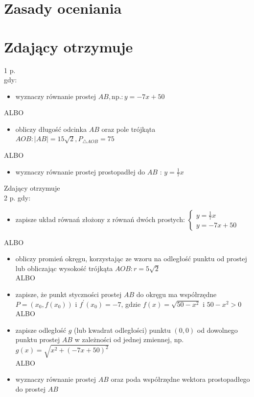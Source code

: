 \documentclass[10pt]{article}
\begin{document}
\section*{Zasady oceniania}
\section*{Zdający otrzymuje}
1 p.\\
gdy:

\begin{itemize}
  \item wyznaczy równanie prostej $A B, \mathrm{np} .: y=-7 x+50$
\end{itemize}

ALBO

\begin{itemize}
  \item obliczy długość odcinka $A B$ oraz pole trójkąta $A O B:|A B|=15 \sqrt{2}, P_{\triangle A O B}=75$
\end{itemize}

ALBO

\begin{itemize}
  \item wyznaczy równanie prostej prostopadłej do $A B$ : $y=\frac{1}{7} x$
\end{itemize}

Zdający otrzymuje\\
2 p. gdy:

\begin{itemize}
  \item zapisze układ równań złożony z równań dwóch prostych: $\left\{\begin{array}{l}y=\frac{1}{7} x \\ y=-7 x+50\end{array}\right.$
\end{itemize}

ALBO

\begin{itemize}
  \item obliczy promień okręgu, korzystając ze wzoru na odległość punktu od prostej lub obliczając wysokość trójkąta $A O B: r=5 \sqrt{2}$\\
ALBO
  \item zapisze, że punkt styczności prostej $A B$ do okręgu ma współrzędne $P=\left(x_{0}, f\left(x_{0}\right)\right)$ i $f^{\prime}\left(x_{0}\right)=-7$, gdzie $f(x)=\sqrt{50-x^{2}}$ i $50-x^{2}>0$\\
ALBO
  \item zapisze odległość $g$ (lub kwadrat odległości) punktu $(0,0)$ od dowolnego punktu prostej $A B$ w zależności od jednej zmiennej, np. $g(x)=\sqrt{x^{2}+(-7 x+50)^{2}}$\\
ALBO
  \item wyznaczy równanie prostej $A B$ oraz poda współrzędne wektora prostopadłego do prostej $A B$
\end{itemize}
\end{document}
